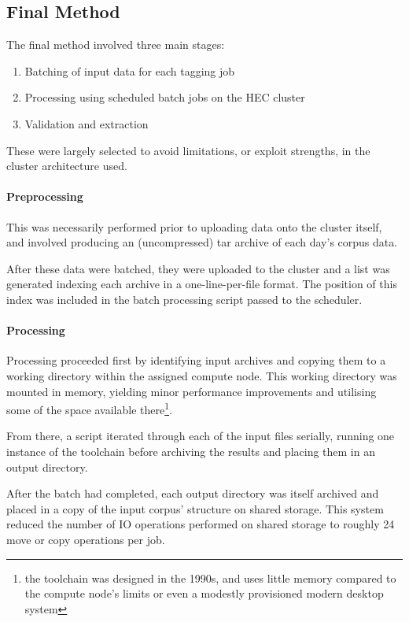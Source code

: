 \subsection{Final Method}
The final method involved three main stages:

\begin{enumerate}
    \item Batching of input data for each tagging job
    \item Processing using scheduled batch jobs on the HEC cluster
    \item Validation and extraction
\end{enumerate}

These were largely selected to avoid limitations, or exploit strengths, in the cluster architecture used.

\paragraph{Preprocessing}
This was necessarily performed prior to uploading data onto the cluster itself, and involved producing an (uncompressed) tar archive of each day's corpus data.

After these data were batched, they were uploaded to the cluster and a list was generated indexing each archive in a one-line-per-file format.  The position of this index was included in the batch processing script passed to the scheduler.

\paragraph{Processing}
Processing proceeded first by identifying input archives and copying them to a working directory within the assigned compute node.  This working directory was mounted in memory, yielding minor performance improvements and utilising some of the space available there\footnote{the toolchain was designed in the 1990s, and uses little memory compared to the compute node's limits or even a modestly provisioned modern desktop system}.

From there, a script iterated through each of the input files serially, running one instance of the toolchain before archiving the results and placing them in an output directory.

After the batch had completed, each output directory was itself archived and placed in a copy of the input corpus' structure on shared storage.  This system reduced the number of IO operations performed on shared storage to roughly 24 move or copy operations per job.

